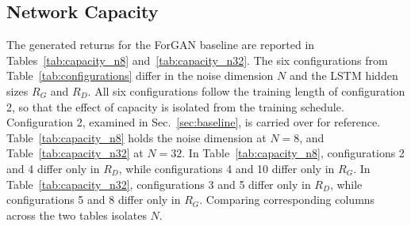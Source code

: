 \subsection{Network Capacity}\label{sec:network-capacity}

The generated returns for the ForGAN baseline are reported in Tables~\ref{tab:capacity_n8} and~\ref{tab:capacity_n32}. The six configurations from Table~\ref{tab:configurations} differ in the noise dimension $N$ and the LSTM hidden sizes $R_G$ and $R_D$. All six configurations follow the training length of configuration 2, so that the effect of capacity is isolated from the training schedule. Configuration 2, examined in Sec.~\ref{sec:baseline}, is carried over for reference. Table~\ref{tab:capacity_n8} holds the noise dimension at $N = 8$, and Table~\ref{tab:capacity_n32} at $N = 32$. In Table~\ref{tab:capacity_n8}, configurations 2 and 4 differ only in $R_D$, while configurations 4 and 10 differ only in $R_G$. In Table~\ref{tab:capacity_n32}, configurations 3 and 5 differ only in $R_D$, while configurations 5 and 8 differ only in $R_G$. Comparing corresponding columns across the two tables isolates $N$.


